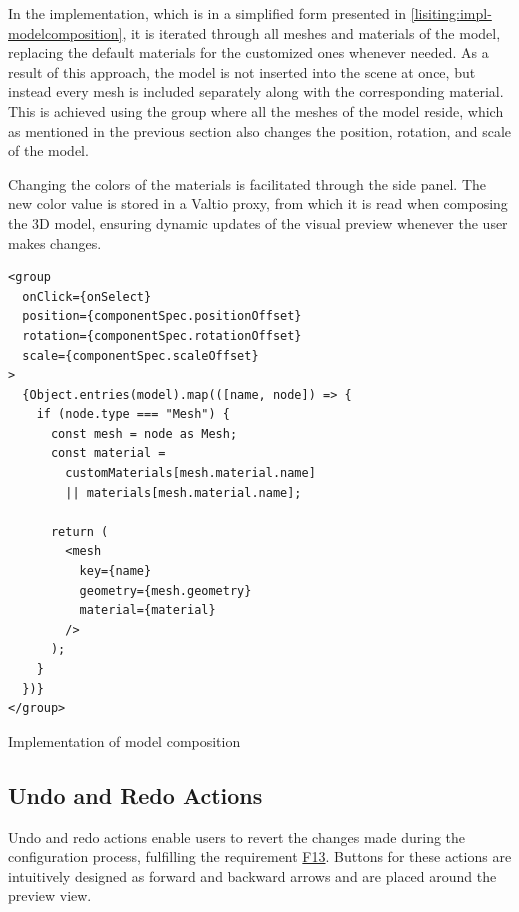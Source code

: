 In the implementation, which is in a simplified form presented in \autoref{lisiting:impl-modelcomposition}, it is iterated through all meshes and materials of the model, replacing the default materials for the customized ones whenever needed. As a result of this approach, the model is not inserted into the scene at once, but instead every mesh is included separately along with the corresponding material. This is achieved using the group where all the meshes of the model reside, which as mentioned in the previous section also changes the position, rotation, and scale of the model.

Changing the colors of the materials is facilitated through the side panel. The new color value is stored in a Valtio proxy, from which it is read when composing the 3D model, ensuring dynamic updates of the visual preview whenever the user makes changes.

\begin{listing}[h!]
\begin{verbatim}
<group
  onClick={onSelect}
  position={componentSpec.positionOffset}
  rotation={componentSpec.rotationOffset}
  scale={componentSpec.scaleOffset}
>
  {Object.entries(model).map(([name, node]) => {
    if (node.type === "Mesh") {
      const mesh = node as Mesh;
      const material =
        customMaterials[mesh.material.name] 
        || materials[mesh.material.name];

      return (
        <mesh
          key={name}
          geometry={mesh.geometry}
          material={material}
        />
      );
    }
  })}
</group>
\end{verbatim}
\caption{Implementation of model composition}
\label{lisiting:impl-modelcomposition}
\end{listing}


\subsection{Undo and Redo Actions}

Undo and redo actions enable users to revert the changes made during the configuration process, fulfilling the requirement \hyperref[itm:F13]{F13}. Buttons for these actions are intuitively designed as forward and backward arrows and are placed around the preview view.


